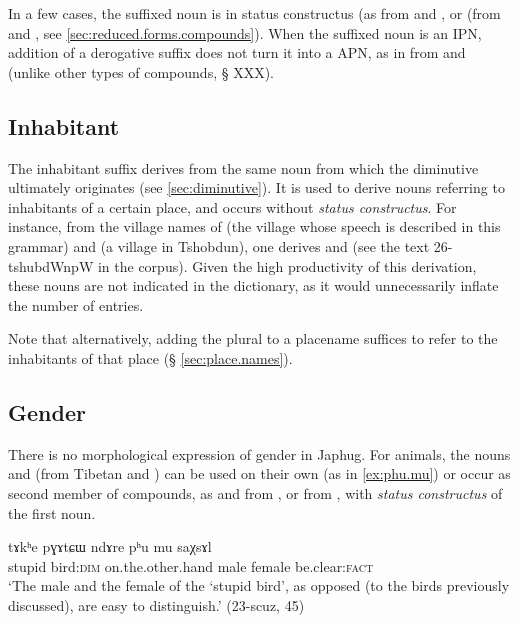  In a few cases, the suffixed noun is in status constructus (as  from  and , or  (from  and , see \ref{sec:reduced.forms.compounds}). When the suffixed noun is an IPN, addition of a derogative suffix does not turn it into a APN, as in  from  and  (unlike other types of compounds, § XXX).

\subsection{Inhabitant} \label{ex:inhabitant.pW}
The inhabitant suffix  derives from the same noun  from which the diminutive  ultimately originates (see \ref{sec:diminutive}). It is used to derive nouns referring to inhabitants of a certain place, and occurs without \textit{status constructus}. For instance, from the village names of  (the village whose speech is described in this grammar) and  (a village in Tshobdun), one derives  and  (see the text 26-tshubdWnpW in the corpus). Given the high productivity of this derivation, these nouns are not indicated in the dictionary, as it would unnecessarily inflate the number of entries.

Note that alternatively, adding the plural   to a placename suffices to refer to the inhabitants of that place (§ \ref{sec:place.names}).

\subsection{Gender} \label{sec:gender}
There is no morphological expression of gender in Japhug. For animals, the nouns  and  (from Tibetan  and ) can be used on their own (as in \ref{ex:phu.mu}) or occur as second member of compounds, as  and  from , or  from , with \textit{status constructus} of the first noun.

\begin{exe}
\ex \label{ex:phu.mu}
\gll tɤkʰe pɣɤtɕɯ ndɤre pʰu mu saχsɤl \\
stupid bird:\textsc{dim} on.the.other.hand male female be.clear:\textsc{fact} \\
\glt `The male and the female of the `stupid bird', as opposed (to the birds previously discussed), are easy to distinguish.' (23-scuz, 45)
\end{exe}

